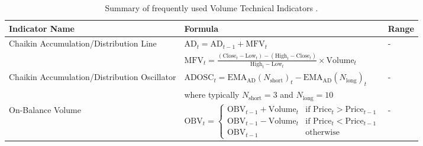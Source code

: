 \begin{table}[htb!]
\centering
\footnotesize
\begin{tabularx}{\textwidth}{@{}lXl@{}}
\toprule
\textbf{Indicator Name} & \textbf{Formula} & \textbf{Range} \\
\midrule
Chaikin Accumulation/Distribution Line & $\text{AD}_t = \text{AD}_{t-1} + \text{MFV}_t$ & - \\
\addlinespace
& $\text{MFV}_t = \frac{(\text{Close}_t - \text{Low}_t) - (\text{High}_t - \text{Close}_t)}{\text{High}_t - \text{Low}_t} \times \text{Volume}_t$ & \\
\addlinespace
Chaikin Accumulation/Distribution Oscillator & $\text{ADOSC}_t = \text{EMA}_\text{AD}(N_{\text{short}})_t - \text{EMA}_\text{AD}(N_{\text{long}})_t$ & - \\
\addlinespace
& where typically $N_{\text{short}} = 3$ and $N_{\text{long}} = 10$ & \\
\addlinespace
On-Balance Volume & $\text{OBV}_t =
\begin{cases}
\text{OBV}_{t-1} + \text{Volume}_t & \text{if } \text{Price}_t > \text{Price}_{t-1} \\
\text{OBV}_{t-1} - \text{Volume}_t & \text{if } \text{Price}_t < \text{Price}_{t-1} \\
\text{OBV}_{t-1} & \text{otherwise}
\end{cases}$ & - \\
\bottomrule
\end{tabularx}
\caption{Summary of frequently used Volume Technical Indicators \cite{jansen_machine_2020}.}
\label{Tables:VolumeIndicators}
\end{table}